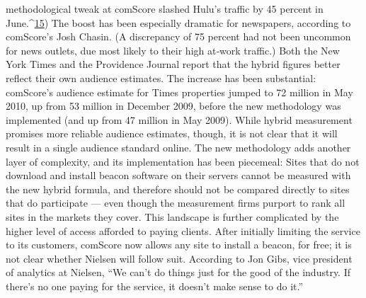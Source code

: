 methodological tweak at comScore slashed Hulu’s traffic by 45 percent in
June.^{\href{#endnotes}{15}})
The boost has been especially dramatic for newspapers, according to
comScore’s Josh Chasin. (A discrepancy of 75 percent had not been
uncommon for news outlets, due most likely to their high at‐work traffic.)
Both the New York Times and the Providence Journal report that the hybrid
figures better reflect their own audience estimates. The increase has been
substantial: comScore’s audience estimate for Times properties jumped to
72 million in May 2010, up from 53 million in December 2009, before the
new methodology was implemented (and up from 47 million in May
2009).
While hybrid measurement promises more reliable audience estimates,
though, it is not clear that it will result in a single audience standard
online. The new methodology adds another layer of complexity, and its
implementation has been piecemeal: Sites that do not download and
install beacon software on their servers cannot be measured with the new
hybrid formula, and therefore should not be compared directly to sites
that do participate — even though the measurement firms purport to rank
all sites in the markets they cover.
This landscape is further complicated by the higher level of access
afforded to paying clients. After initially limiting the service to its
customers, comScore now allows any site to install a beacon, for free; it is
not clear whether Nielsen will follow suit. According to Jon Gibs, vice
president of analytics at Nielsen, ``We can’t do things just for the good of
the industry. If there’s no one paying for the service, it doesn’t make sense
to do it.''
